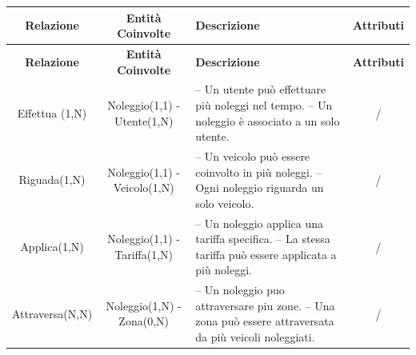 \documentclass[11pt,a4paper]{article}
\begin{document}
\begin{tabularx}{\textwidth}{| C{0.95} | C{0.90} | L{1.30} | C{0.75} |}
    \hline
    \textbf{Relazione}                                             & \textbf{Entità Coinvolte}                      & \textbf{Descrizione} & \textbf{Attributi} \\ \hline
    \endfirsthead %

    \hline
    \textbf{Relazione}                                             & \textbf{Entità Coinvolte}                      & \textbf{Descrizione} & \textbf{Attributi} \\ \hline
    \endhead %

    Effettua (1,N)                                                 & Noleggio(1,1) - Utente(1,N)                    &
    -- Un utente può effettuare più noleggi nel tempo. \newline
    -- Un noleggio è associato a un solo utente.                   &
    /                                                                                                                                                           \\ \hline

    Riguada(1,N)                                                   & Noleggio(1,1) - Veicolo(1,N)                   &
    -- Un veicolo può essere coinvolto in più noleggi. \newline
    -- Ogni noleggio riguarda un solo veicolo.                     & /                                                                                          \\ \hline

    Applica(1,N)                                                   & Noleggio(1,1) - \newline Tariffa(1,N)          &
    -- Un noleggio applica una tariffa specifica. \newline
    -- La stessa tariffa può essere applicata a più noleggi.       & /                                                                                          \\ \hline

    Attraversa(N,N)                                                & Noleggio(1,N) - \newline Zona(0,N)             &
    -- Un noleggio puo attraversare piu zone. \newline
    -- Una zona può essere attraversata da più veicoli noleggiati. & /                                                                                          \\ \hline


\end{tabularx}
\end{document}
